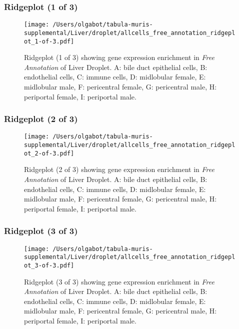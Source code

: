 \subsubsection{Ridgeplot (1 of 3)}
\begin{figure}[h]
\centering
\texttt{[image: /Users/olgabot/tabula-muris-supplemental/Liver/droplet/allcells\_free\_annotation\_ridgeplot\_1-of-3.pdf]}

\caption{ Ridgeplot (1 of 3)  showing gene expression enrichment in \emph{Free Annotation} of Liver Droplet. A: bile duct epithelial cells, B: endothelial cells, C: immune cells, D: midlobular female, E: midlobular male, F: pericentral female, G: pericentral male, H: periportal female, I: periportal male.}
\end{figure}


\clearpage

\subsubsection{Ridgeplot (2 of 3)}
\begin{figure}[h]
\centering
\texttt{[image: /Users/olgabot/tabula-muris-supplemental/Liver/droplet/allcells\_free\_annotation\_ridgeplot\_2-of-3.pdf]}

\caption{ Ridgeplot (2 of 3)  showing gene expression enrichment in \emph{Free Annotation} of Liver Droplet. A: bile duct epithelial cells, B: endothelial cells, C: immune cells, D: midlobular female, E: midlobular male, F: pericentral female, G: pericentral male, H: periportal female, I: periportal male.}
\end{figure}


\clearpage

\subsubsection{Ridgeplot (3 of 3)}
\begin{figure}[h]
\centering
\texttt{[image: /Users/olgabot/tabula-muris-supplemental/Liver/droplet/allcells\_free\_annotation\_ridgeplot\_3-of-3.pdf]}

\caption{ Ridgeplot (3 of 3)  showing gene expression enrichment in \emph{Free Annotation} of Liver Droplet. A: bile duct epithelial cells, B: endothelial cells, C: immune cells, D: midlobular female, E: midlobular male, F: pericentral female, G: pericentral male, H: periportal female, I: periportal male.}
\end{figure}


